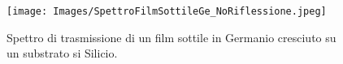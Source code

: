 \begin{figure}[h!]
    \centering
    \texttt{[image: Images/SpettroFilmSottileGe\_NoRiflessione.jpeg]}
    \caption{Spettro di trasmissione di un film sottile in Germanio cresciuto su un substrato si Silicio.}
    \label{fig:my_label}
\end{figure}